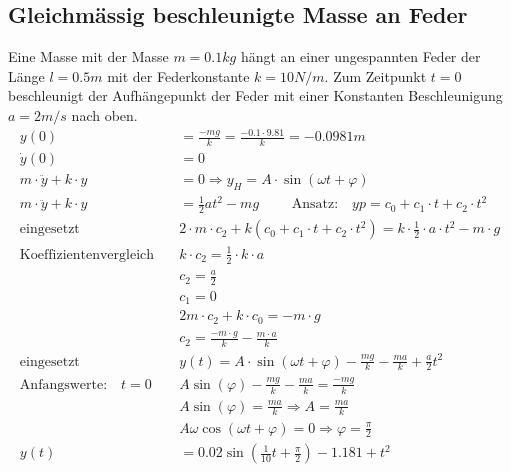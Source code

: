 \subsection{Gleichmässig beschleunigte Masse an Feder}
Eine Masse mit der Masse $m=0.1kg$ hängt an einer ungespannten Feder der Länge $l=0.5m$ mit der Federkonstante $k=10N/m$. Zum Zeitpunkt $t=0$ beschleunigt der Aufhängepunkt der Feder mit einer Konstanten Beschleunigung $a=2m/s$ nach oben.
\begin{align*}
	y(0) &=\frac{-mg}{k} = \frac{-0.1\cdot 9.81}{k} = -0.0981m\\
	\dot{y}(0) &= 0\\
	m\cdot \ddot{y}+k\cdot y &= 0 \Rightarrow y_H = A\cdot \sin(\omega t +\varphi)\\
	m\cdot \ddot{y}+k\cdot y &=\frac{1}{2} a t^2-mg\qquad \textrm{ Ansatz:}\quad yp=c_0+c_1\cdot t +c_2\cdot t^2\\
	\textrm{eingesetzt }\quad &2\cdot m\cdot c_2+k(c_0+c_1\cdot t +c_2\cdot t^2)=k\cdot \frac{1}{2}\cdot a\cdot t^2 -m\cdot g\\
	\textrm{Koeffizientenvergleich}\quad &k\cdot c_2 = \frac{1}{2} \cdot k\cdot a\\
	&c_2 = \frac{a}{2}\\
	&c_1=0\\
	&2m\cdot c_2+k\cdot c_0 = -m\cdot g\\
	&c_2 =\frac{-m\cdot g}{k}-\frac{m\cdot a}{k}\\
	\textrm{eingesetzt}\quad &y(t) = A\cdot \sin(\omega t +\varphi) -\frac{mg}{k}-\frac{ma}{k}+\frac{a}{2} t^2\\
	\textrm{Anfangswerte:}\quad t=0\quad &A\sin(\varphi) -\frac{mg}{k}-\frac{ma}{k} = \frac{-mg}{k}\\
	&A\sin(\varphi) = \frac{ma}{k}\Rightarrow A=\frac{ma}{k}\\
	&A\omega \cos (\omega t+\varphi) = 0 \Rightarrow \varphi = \frac{\pi}{2}\\
	y(t) &=0.02\sin\left(\frac{1}{10}t+\frac{\pi}{2}\right)-1.181+t^2
\end{align*}